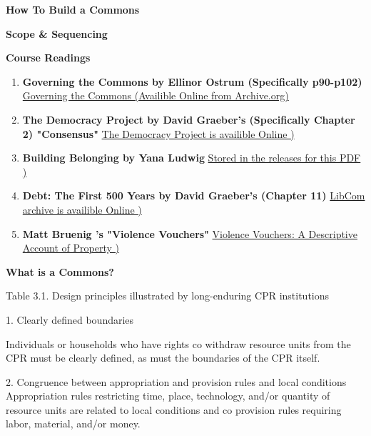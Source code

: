 \documentclass{article}
\begin{document}
	
{\huge \textbf{How To Build a Commons}}

\vspace{1cm}

{\Large \textbf{Scope \& Sequencing}}

\vspace{1cm}

{\huge \textbf{Course Readings}}

\begin{enumerate}
	
	\item \textbf{ Governing the Commons  by Ellinor Ostrum (Specifically p90-p102) } \href{https://archive.org/details/governingthecommons}{Governing the Commons (Availible Online from Archive.org)}
	
	\item \textbf{The Democracy Project by David Graeber's  (Specifically Chapter 2)  "Consensus"} \href{https://theanarchistlibrary.org/library/david-graeber-the-democracy-project#toc21}{The Democracy Project is availible Online )}
	
	\item \textbf{Building Belonging by Yana Ludwig} \href{https://github.com/How-To-Build-a-Commons/Scope-Sequencing/releases}{ Stored in the releases for this PDF )}
	
	\item \textbf{Debt: The First 500 Years by David Graeber's  (Chapter 11)} \href{https://files.libcom.org/files/__Debt__The_First_5_000_Years.pdf}{LibCom archive is availible Online )}
	
	\item \textbf{Matt Bruenig 's "Violence Vouchers"} \href{	https://mattbruenig.com/2014/03/28/violence-vouchers-a-descriptive-account-of-property/}{Violence Vouchers: A Descriptive Account of Property )}

	
\end{enumerate}

\pagebreak
{\huge \textbf{What is a Commons?}}

Table 3.1. Design principles illustrated by long-enduring CPR institutions

1. Clearly defined boundaries

Individuals or households who have rights co withdraw resource units from the CPR must be clearly defined, as must the boundaries of the CPR itself.

2. Congruence between appropriation and provision rules and local conditions Appropriation rules restricting time, place, technology, and/or quantity of resource units are related to local conditions and co provision rules requiring labor, material, and/or money.
\end{document}
